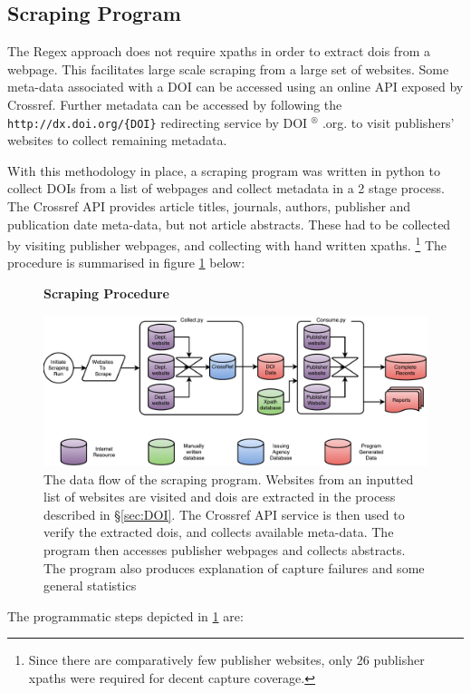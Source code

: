 \subsection{Scraping Program}
\label{sec:SCRAPING_PROGRAM}
The Regex approach does not require xpaths in order to extract dois from a webpage. This facilitates large scale scraping from a large set of websites. Some meta-data associated with a DOI can be accessed using an online API exposed by Crossref. Further metadata can be accessed by following the \texttt{http://dx.doi.org/\{DOI\}} redirecting service by DOI $^{\circledR}$ .org. to visit publishers' websites to collect remaining metadata. 

With this methodology in place, a scraping program was written in python to collect DOIs from a list of webpages and collect metadata in a 2 stage process. The Crossref API provides article titles, journals, authors, publisher and publication date meta-data, but not article abstracts. These had to be collected by visiting publisher webpages, and collecting with hand written xpaths. \footnote{Since there are comparatively few publisher websites, only 26 publisher xpaths were required for decent capture coverage.} The procedure is summarised in figure \ref{fig:Cherry} below:
\begin{figure}[H]
    \centering
    \textbf{Scraping Procedure}\par\medskip
    \includegraphics[width=\textwidth]{Data_Acquisition/Cherry2.pdf}
    \caption[Data Flow in Scraping Procedure]{The data flow of the scraping program. Websites from an inputted list of websites are visited and dois are extracted in the process described in  \S\ref{sec:DOI}. The Crossref API service is then used to verify the extracted dois, and collects available meta-data. The program then accesses publisher webpages and collects abstracts. The program also produces explanation of capture failures and some general statistics}
     \label{fig:Cherry}
\end{figure}
The programmatic steps depicted in \ref{fig:Cherry} are:
